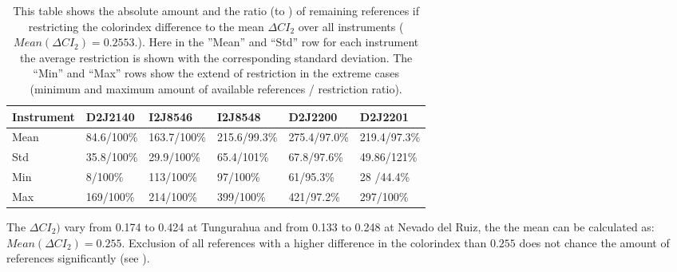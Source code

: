 \begin{table}[h]
	\centering
	\begin{tabular}{|p{1.8cm}|p{2.15cm}|p{2.15cm}|p{2.15cm}|p{2.15cm}|p{2.15cm}|}
		Instrument	&D2J2140&I2J8546& I2J8548&D2J2200&D2J2201\\
		\toprule
		Mean&
		84.6/100\% &	163.7/100\%&	215.6/99.3\%&
		275.4/97.0\% &219.4/97.3\% \\
		\midrule
		Std&
		35.8/100\% &	29.9/100\% &
		65.4/101\%&
		67.8/97.6\% &
		49.86/121\% \\
		\midrule
		Min&
		8/100\% &
		113/100\% 
		&97/100\% 
		&61/95.3\% 
		&28	/44.4\% \\
		\midrule
		Max
		&169/100\% 
		&214/100\% 
		&399/100\% 
		&421/97.2\% 
		&297/100\%  \\
		\bottomrule
	\end{tabular}
	\caption{This table shows the absolute amount and the ratio  (to ) of remaining references if restricting the colorindex difference to the mean $\Delta CI_{2}$ over all instruments ($Mean(\Delta CI_{2}) = 0.2553.$). Here in the ”Mean” and “Std” row for each  instrument the average restriction is shown with the corresponding standard deviation. The “Min” and “Max” rows show the extend of restriction in the extreme cases (minimum and maximum amount of available references / restriction ratio).}
	\label{tab:colidxres}
\end{table}	
The $\Delta CI_{2})$ vary from 0.174 to 0.424 at Tungurahua and from 0.133 to 0.248 at Nevado del Ruiz, the
the mean can be calculated as: $Mean(\Delta CI_{2}) = 0.255$. Exclusion of all references with a higher difference in the colorindex than $ 0.255$ does not chance the amount of references significantly (see ).\\


